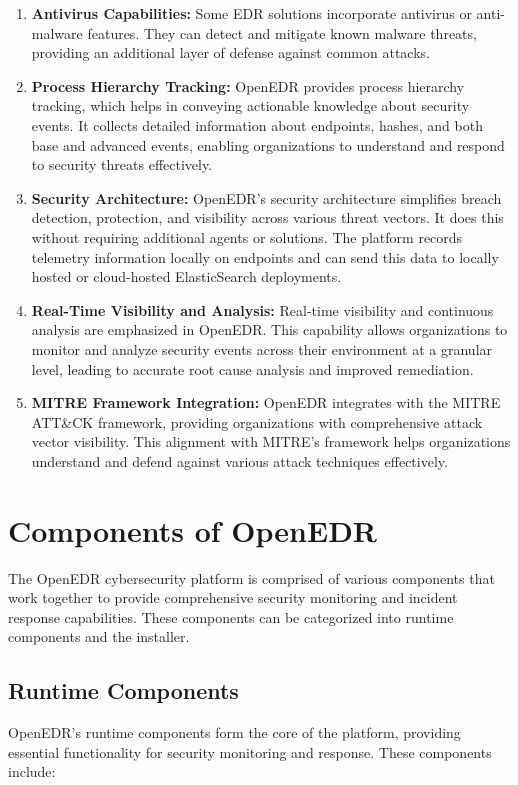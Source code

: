 \documentclass{article}
\begin{document}
\begin{enumerate}
    \item \textbf{Antivirus Capabilities:} Some EDR solutions incorporate antivirus or anti-malware features. They can detect and mitigate known malware threats, providing an additional layer of defense against common attacks.

    
    \item \textbf{Process Hierarchy Tracking:} OpenEDR provides process hierarchy tracking, which helps in conveying actionable knowledge about security events. It collects detailed information about endpoints, hashes, and both base and advanced events, enabling organizations to understand and respond to security threats effectively.
    
    \item \textbf{Security Architecture:} OpenEDR's security architecture simplifies breach detection, protection, and visibility across various threat vectors. It does this without requiring additional agents or solutions. The platform records telemetry information locally on endpoints and can send this data to locally hosted or cloud-hosted ElasticSearch deployments.
    
    \item \textbf{Real-Time Visibility and Analysis:}  Real-time visibility and continuous analysis are emphasized in OpenEDR. This capability allows organizations to monitor and analyze security events across their environment at a granular level, leading to accurate root cause analysis and improved remediation.
    
    \item \textbf{MITRE Framework Integration:}  OpenEDR integrates with the MITRE ATT\&CK framework, providing organizations with comprehensive attack vector visibility. This alignment with MITRE's framework helps organizations understand and defend against various attack techniques effectively.
\end{enumerate}
\section{Components of OpenEDR}
The OpenEDR cybersecurity platform is comprised of various components that work together to provide comprehensive security monitoring and incident response capabilities. These components can be categorized into runtime components and the installer.

\subsection{Runtime Components}
OpenEDR's runtime components form the core of the platform, providing essential functionality for security monitoring and response. These components include:
\end{document}
